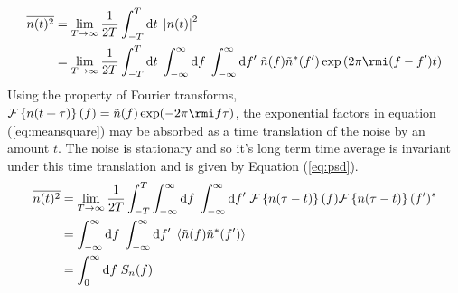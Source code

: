 \begin{eqnarray}\label{eq:meansquare}
\overline{n(t)^{2}}&=\lim_{T\rightarrow\infty}\frac{1}{2T}\int_{-T}^{T}\textrm{d}t\;\left| n(t) \right|^{2} \nonumber \\
&=\lim_{T\rightarrow\infty}\frac{1}{2T}\int_{-T}^{T}\textrm{d}t\; \int_{-\infty}^{\infty}\textrm{d}f\;\int_{-\infty}^{\infty}\textrm{d}f'\;\tilde{n}(f)\tilde{n}^{*}(f')\exp\left(2\pi \rmi (f-f')t \right)
\end{eqnarray}
Using the property of Fourier transforms, ${\cal{F}}\left\{ n(t+\tau) \right\}(f)=\tilde{n}(f)\exp (-2\pi \rmi f\tau )$, the exponential factors in equation (\ref{eq:meansquare}) may be absorbed as a time translation of the noise by an amount $t$. The noise is stationary and so it's long term time average is invariant under this time translation and is given by Equation (\ref{eq:psd}).
\begin{eqnarray}\label{eq:meansquare1}
\overline{n(t)^{2}}& = \lim_{T\rightarrow\infty}\frac{1}{2T}\int_{-T}^{T}\int_{-\infty}^{\infty}\textrm{d}f\;\int_{-\infty}^{\infty}\textrm{d}f'\;{\cal{F}}\left\{ n(\tau-t) \right\}(f){\cal{F}}\left\{ n(\tau-t) \right\}(f')^{*} \nonumber \\
&=\int_{-\infty}^{\infty}\textrm{d}f\;\int_{-\infty}^{\infty}\textrm{d}f'\;\left<\tilde{n}(f)\tilde{n}^{*}(f')\right>\nonumber \\
& = \int_{0}^{\infty}\textrm{d}f\; S_{n}(f)
\end{eqnarray}





